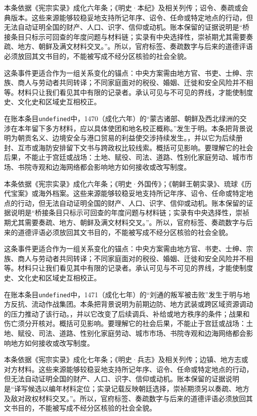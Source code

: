 本条依据《宪宗实录》成化六年条；《明史·本纪》及相关列传；诏令、奏疏或会典版本。这些来源能够较稳妥地支持所记年序、诏令、任命或特定地点的行动，但无法自动证明全国的财产、人口、识字、信仰或动机。账本保留的证据说明是“桥接条目只标示可回查的年度问题与材料链；实录有中央选择性，崇祯期尤其需要奏疏、地方、朝鲜及满文材料交叉。”。所以，官府标签、奏疏数字与后来的道德评语必须放回其文书目的，不能被写成不经分区核验的社会全貌。

这条事件更适合作为一组关系变化的锚点：中央方案需由地方官、书吏、士绅、宗族、商人与劳动者共同转译；不同家庭面对的税役、婚姻、迁徙和安全风险并不相等。材料只让我们看见其中有限的记录者。承认可见与不可见的界线，才能使制度史、文化史和区域史互相校正。

在账本条目\texttt{undefined}中，1470（成化六年）的“蒙古诸部、朝鲜及西北绿洲的交涉在本年留下多方材料，应以具体使团和地名校正概称。”发生于明。本条把背景说明为朝贡名义、边境安全与港口贸易的利益使交涉持续发生。，并以它为后续册封、互市或海防安排留下文书与跨政权比较线索。概括可见影响。要理解它的社会后果，不能止于宫廷或战场：土地、赋役、司法、道路、性别化家庭劳动、城市市场、书院寺观和边海网络都会影响地方如何接收或改写制度。

本条依据《宪宗实录》成化六年条；《明史·外国传》；《朝鲜王朝实录》、琉球《历代宝案》或海外档案。这些来源能够较稳妥地支持所记年序、诏令、任命或特定地点的行动，但无法自动证明全国的财产、人口、识字、信仰或动机。账本保留的证据说明是“桥接条目只标示可回查的年度问题与材料链；实录有中央选择性，崇祯期尤其需要奏疏、地方、朝鲜及满文材料交叉。”。所以，官府标签、奏疏数字与后来的道德评语必须放回其文书目的，不能被写成不经分区核验的社会全貌。

这条事件更适合作为一组关系变化的锚点：中央方案需由地方官、书吏、士绅、宗族、商人与劳动者共同转译；不同家庭面对的税役、婚姻、迁徙和安全风险并不相等。材料只让我们看见其中有限的记录者。承认可见与不可见的界线，才能使制度史、文化史和区域史互相校正。

在账本条目\texttt{undefined}中，1471（成化七年）的“刘通的叛军被击败”发生于明与地方反抗、流动作战集团。本条把背景说明为前期边防、地方武装或跨区域资源调动的压力推动了该行动。，并以它改变了后续调兵、补给或地方秩序的条件；战果和伤亡须分开核对。概括可见影响。要理解它的社会后果，不能止于宫廷或战场：土地、赋役、司法、道路、性别化家庭劳动、城市市场、书院寺观和边海网络都会影响地方如何接收或改写制度。

本条依据《宪宗实录》成化七年条；《明史·兵志》及相关列传；边镇、地方志或对方材料。这些来源能够较稳妥地支持所记年序、诏令、任命或特定地点的行动，但无法自动证明全国的财产、人口、识字、信仰或动机。账本保留的证据说明是“译写候选以编年材料定位；实录记载反映朝廷选择，崇祯期须另以奏疏、地方及敌对政权材料交叉。”。所以，官府标签、奏疏数字与后来的道德评语必须放回其文书目的，不能被写成不经分区核验的社会全貌。

